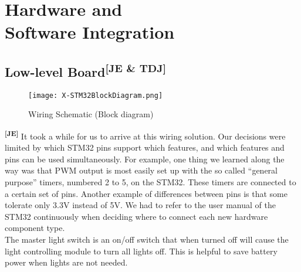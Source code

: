\chapter[Hardware and Software Integration]{Hardware and\\Software Integration}
\section[Low-level Board]{Low-level Board\textsuperscript{[JE \& TDJ]}}
\begin{figure}[ht]
  \centering
  \texttt{[image: X-STM32BlockDiagram.png]}
  \caption{Wiring Schematic (Block diagram)}
  \label{blockdiag}
\end{figure}
\textsuperscript{\textbf{[JE]}}
It took a while for us to arrive at this wiring solution. Our decisions were
limited by which STM32 pins support which features, and which features and pins
can be used simultaneously. For example, one thing we learned along the way was
that PWM output is most easily set up with the so called ``general purpose''
timers, numbered 2 to 5, on the STM32. These timers are connected to a certain
set of pins. Another example of differences between pins is that some tolerate
only 3.3V instead of 5V. We had to refer to the user manual of the STM32
continuously when deciding where to connect each new hardware component type.\\

\noindent
The master light switch is an on/off switch that when turned off will cause the
light controlling module to turn all lights off. This is helpful to save battery
power when lights are not needed.\\

